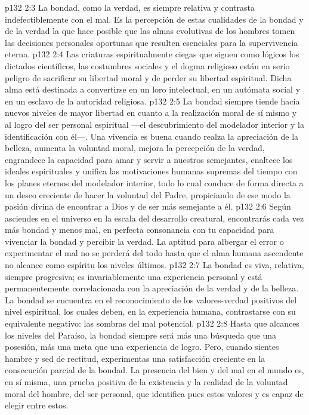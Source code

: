 \vs p132 2:3 La bondad, como la verdad, es siempre relativa y contrasta indefectiblemente con el mal. Es la percepción de estas cualidades de la bondad y de la verdad la que hace posible que las almas evolutivas de los hombres tomen las decisiones personales oportunas que resulten esenciales para la supervivencia eterna.
\vs p132 2:4 Las criaturas espiritualmente ciegas que siguen como lógicos los dictados científicos, las costumbres sociales y el dogma religioso están en serio peligro de sacrificar su libertad moral y de perder su libertad espiritual. Dicha alma está destinada a convertirse en un loro intelectual, en un autómata social y en un esclavo de la autoridad religiosa.
\vs p132 2:5 La bondad siempre tiende hacia nuevos niveles de mayor libertad en cuanto a la realización moral de sí mismo y al logro del ser personal espiritual ---el descubrimiento del modelador interior y la identificación con él---. Una vivencia es buena cuando realza la apreciación de la belleza, aumenta la voluntad moral, mejora la percepción de la verdad, engrandece la capacidad para amar y servir a nuestros semejantes, enaltece los ideales espirituales y unifica las motivaciones humanas supremas del tiempo con los planes eternos del modelador interior, todo lo cual conduce de forma directa a un deseo creciente de hacer la voluntad del Padre, propiciando de ese modo la pasión divina de encontrar a Dios y de ser más semejante a él.
\vs p132 2:6 \pc Según asciendes en el universo en la escala del desarrollo creatural, encontrarás cada vez más bondad y menos mal, en perfecta consonancia con tu capacidad para vivenciar la bondad y percibir la verdad. La aptitud para albergar el error o experimentar el mal no se perderá del todo hasta que el alma humana ascendente no alcance como espíritu los niveles últimos.
\vs p132 2:7 La bondad es viva, relativa, siempre progresiva; es invariablemente una experiencia personal y está permanentemente correlacionada con la apreciación de la verdad y de la belleza. La bondad se encuentra en el reconocimiento de los valores\hyp{}verdad positivos del nivel espiritual, los cuales deben, en la experiencia humana, contrastarse con su equivalente negativo: las sombras del mal potencial.
\vs p132 2:8 \pc Hasta que alcances los niveles del Paraíso, la bondad siempre será más una búsqueda que una posesión, más una meta que una experiencia de logro. Pero, cuando sientes hambre y sed de rectitud, experimentas una satisfacción creciente en la consecución parcial de la bondad. La presencia del bien y del mal en el mundo es, en sí misma, una prueba positiva de la existencia y la realidad de la voluntad moral del hombre, del ser personal, que identifica pues estos valores y es capaz de elegir entre estos.
